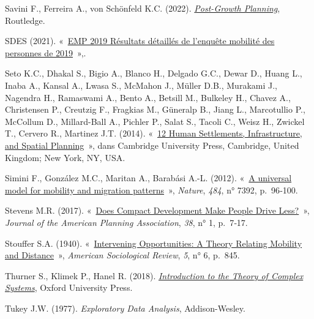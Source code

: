 \documentclass[
  9pt,
  a4paper,
  DIV=11]{scrreprt}
\newlength{\cslhangindent}
\newenvironment{CSLReferences}[2] %
 {\begin{list}{}{%
  \setlength{\itemindent}{0pt}
  \setlength{\leftmargin}{0pt}
  \setlength{\parsep}{0pt}
  \ifodd #1
   \setlength{\leftmargin}{\cslhangindent}
   \setlength{\itemindent}{-1\cslhangindent}
  \fi
  \setlength{\itemsep}{#2\baselineskip}}}
 {\end{list}}
\begin{document}
\begin{CSLReferences}{0}{1}
Savini F., Ferreira A., von Schönfeld K.C. (2022).
\emph{\href{https://doi.org/10.4324/9781003160984}{Post-Growth
Planning}}, Routledge.

SDES (2021).
{«~\href{https://www.statistiques.developpement-durable.gouv.fr/resultats-detailles-de-lenquete-mobilite-des-personnes-de-2019}{EMP
2019 Résultats détaillés de l'enquête mobilité des personnes de
2019}~»},.

Seto K.C., Dhakal S., Bigio A., Blanco H., Delgado G.C., Dewar D., Huang
L., Inaba A., Kansal A., Lwasa S., McMahon J., Müller D.B., Murakami J.,
Nagendra H., Ramaswami A., Bento A., Betsill M., Bulkeley H., Chavez A.,
Christensen P., Creutzig F., Fragkias M., Güneralp B., Jiang L.,
Marcotullio P., McCollum D., Millard-Ball A., Pichler P., Salat S.,
Tacoli C., Weisz H., Zwickel T., Cervero R., Martinez J.T. (2014).
{«~\href{https://www.ipcc.ch/site/assets/uploads/2018/02/ipcc_wg3_ar5_chapter12.pdf}{12
Human Settlements, Infrastructure, and Spatial Planning}~»}, dans
Cambridge University Press, Cambridge, United Kingdom; New York, NY,
USA.

Simini F., González M.C., Maritan A., Barabási A.-L. (2012).
{«~\href{https://doi.org/10.1038/nature10856}{A universal model for
mobility and migration patterns}~»}, \emph{Nature}, \emph{484}, n° 7392,
p.~96‑100.

Stevens M.R. (2017).
{«~\href{https://www.tandfonline.com/doi/epdf/10.1080/01944363.2016.1240044?needAccess=true&role=button}{Does
Compact Development Make People Drive Less?}~»}, \emph{Journal of the
American Planning Association}, \emph{38}, n° 1, p.~7‑17.

Stouffer S.A. (1940).
{«~\href{https://doi.org/10.2307/2084520}{Intervening Opportunities: A
Theory Relating Mobility and Distance}~»}, \emph{American Sociological
Review}, \emph{5}, n° 6, p.~845.

Thurner S., Klimek P., Hanel R. (2018).
\emph{\href{https://doi.org/10.1093/oso/9780198821939.001.0001}{Introduction
to the Theory of Complex Systems}}, Oxford University Press.

Tukey J.W. (1977). \emph{Exploratory Data Analysis}, Addison-Wesley.

\end{CSLReferences}
\end{document}
